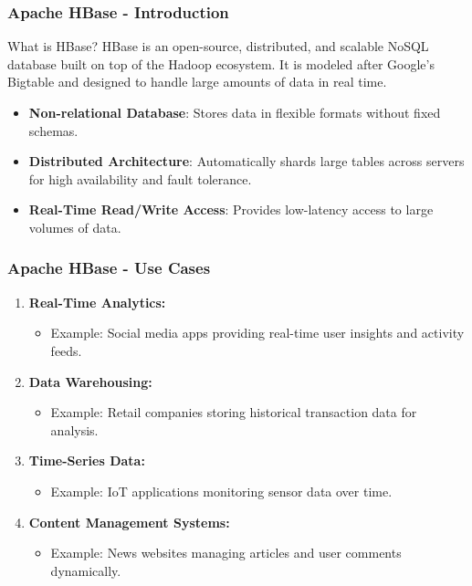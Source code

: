 \documentclass[aspectratio=169]{beamer}
\begin{document}
\begin{frame}[fragile]
  \frametitle{Apache HBase - Introduction}
  \begin{block}{What is HBase?}
    HBase is an open-source, distributed, and scalable NoSQL database built on top of the Hadoop ecosystem. It is modeled after Google’s Bigtable and designed to handle large amounts of data in real time.
  \end{block}

  \begin{itemize}
    \item \textbf{Non-relational Database}: Stores data in flexible formats without fixed schemas.
    \item \textbf{Distributed Architecture}: Automatically shards large tables across servers for high availability and fault tolerance.
    \item \textbf{Real-Time Read/Write Access}: Provides low-latency access to large volumes of data.
  \end{itemize}
\end{frame}

\begin{frame}[fragile]
  \frametitle{Apache HBase - Use Cases}
  \begin{enumerate}
    \item \textbf{Real-Time Analytics:} 
      \begin{itemize}
        \item Example: Social media apps providing real-time user insights and activity feeds.
      \end{itemize}
    \item \textbf{Data Warehousing:} 
      \begin{itemize}
        \item Example: Retail companies storing historical transaction data for analysis.
      \end{itemize}
    \item \textbf{Time-Series Data:} 
      \begin{itemize}
        \item Example: IoT applications monitoring sensor data over time.
      \end{itemize}
    \item \textbf{Content Management Systems:} 
      \begin{itemize}
        \item Example: News websites managing articles and user comments dynamically.
      \end{itemize}
  \end{enumerate}
\end{frame}
\end{document}
